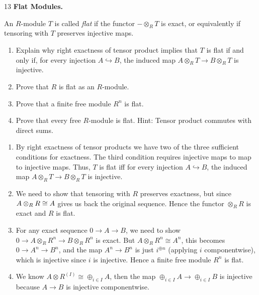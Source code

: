 \documentclass[Notebook.tex]{subfiles}
\begin{document}
\begin{problem}{13} \textbf{Flat Modules.} 
    
    An $R$-module $T$ is called \emph{flat} if the functor $-\otimes_R T$ is exact, or equivalently if tensoring with $T$ preserves injective maps.
    \begin{enumerate}
        \item Explain why right exactness of tensor product implies that $T$ is flat if and only if, for every injection $A\hookrightarrow B$, the induced map $A\otimes_R T \to B\otimes_R T$ is injective.
        \item Prove that $R$ is flat as an $R$-module. 
        \item Prove that a finite free module $R^n$ is flat.
        \item Prove that every free $R$-module is flat. Hint: Tensor product commutes with direct sums.
    \end{enumerate}
\end{problem}

\begin{solution}
    \bbni
    \begin{enumerate}
        \item By right exactness of tensor products we have two of the three sufficient conditions for exactness. The third condition requires injective maps to map to injective maps. Thus, $T$ is flat iff for every injection $A\hookrightarrow B$, the induced map $A\otimes_R T \to B\otimes_R T$ is injective.
        
        \item We need to show that tensoring with $R$ preserves exactness, but since $A \otimes_R R \cong A$ gives us back the original sequence. Hence the functor $\otimes_R R$ is exact and $R$ is flat. 
        
        \item For any exact sequence $0 \to A \to B$, we need to show $0 \to A\otimes_R R^n \to B\otimes_R R^n$ is exact. But $A\otimes_R R^n \cong A^n$, this becomes $0 \to A^n \to B^n$, and the map $A^n \to B^n$ is just $i^{\oplus n}$ (applying $i$ componentwise), which is injective since $i$ is injective. Hence a finite free module $R^n$ is flat. 
        
        \item We know $A \otimes R^{(I)} \cong \oplus_{i \in I} A$, then the map $\oplus_{i \in I} A \to \oplus_{i \in I} B$ is injective because $A \to B$ is injective componentwise. 
    \end{enumerate}
\end{solution}
\end{document}

